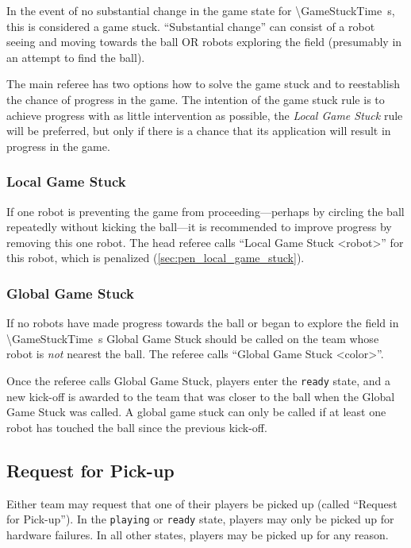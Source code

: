 In the event of no substantial change in the game state for \qty{\GameStuckTime}{\second}, this is considered a game stuck.
``Substantial change'' can consist of a robot seeing and moving towards the ball OR robots exploring the field (presumably in an attempt to find the ball).

The main referee has two options how to solve the game stuck and to reestablish the chance of progress in the game.
The intention of the game stuck rule is to achieve progress with as little intervention as possible, \ie the \emph{Local Game Stuck} rule will be preferred, but only if there is a chance that its application will result in progress in the game.

\subsubsection{Local Game Stuck}
\label{sec:game_stuck:local}

If one robot is preventing the game from proceeding---perhaps by circling the ball repeatedly without kicking the ball---it is recommended to improve progress by removing this one robot.
The head referee calls ``Local Game Stuck \textless robot\textgreater'' for this robot, which is penalized (\cf \cref{sec:pen_local_game_stuck}).

\subsubsection{Global Game Stuck}
\label{sec:game_stuck:global}

If no robots have made progress towards the ball or began to explore the field in \qty{\GameStuckTime}{\second} Global Game Stuck should be called on the team whose robot is \textit{not} nearest the ball.
The referee calls ``Global Game Stuck \textless color\textgreater''.

Once the referee calls Global Game Stuck, players enter the \texttt{ready} state, and a new kick-off is awarded to the team that was closer to the ball when the Global Game Stuck was called.
A global game stuck can only be called if at least one robot has touched the ball since the previous kick-off.

\subsection{Request for Pick-up}
\label{sec:request_for_pickup}

Either team may request that one of their players be picked up (called ``Request for Pick-up'').
In the \texttt{playing} or \texttt{ready} state, players may only be picked up for hardware failures.
In all other states, players may be picked up for any reason.

